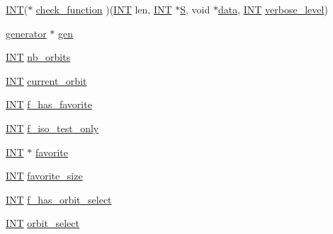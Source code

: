 \begin{DoxyCompactItemize}
\mbox{\hyperlink{galois_8h_a09fddde158a3a20bd2dcadb609de11dc}{I\+NT}}($\ast$ \mbox{\hyperlink{classchoose__points__or__lines_abc61ef917f72864b7f56ca351c84832d}{check\+\_\+function}} )(\mbox{\hyperlink{galois_8h_a09fddde158a3a20bd2dcadb609de11dc}{I\+NT}} len, \mbox{\hyperlink{galois_8h_a09fddde158a3a20bd2dcadb609de11dc}{I\+NT}} $\ast$\mbox{\hyperlink{simeon_8_c_adab47f8243f1b5a2c31df2535d6b37d0}{S}}, void $\ast$\mbox{\hyperlink{classchoose__points__or__lines_a8afcc173b9891ea488adc7a8708b5185}{data}}, \mbox{\hyperlink{galois_8h_a09fddde158a3a20bd2dcadb609de11dc}{I\+NT}} \mbox{\hyperlink{simeon_8_c_a818073fbcc2f439e7c56952f67386122}{verbose\+\_\+level}})
\item 
\mbox{\hyperlink{classgenerator}{generator}} $\ast$ \mbox{\hyperlink{classchoose__points__or__lines_a642aa5b197976155d67c5b34c56d2fd9}{gen}}
\item 
\mbox{\hyperlink{galois_8h_a09fddde158a3a20bd2dcadb609de11dc}{I\+NT}} \mbox{\hyperlink{classchoose__points__or__lines_a5fff403bc7d1f934a69b10e9a20f78e0}{nb\+\_\+orbits}}
\item 
\mbox{\hyperlink{galois_8h_a09fddde158a3a20bd2dcadb609de11dc}{I\+NT}} \mbox{\hyperlink{classchoose__points__or__lines_a5bd569fc8b518f5c245ac9a78c68ea8f}{current\+\_\+orbit}}
\item 
\mbox{\hyperlink{galois_8h_a09fddde158a3a20bd2dcadb609de11dc}{I\+NT}} \mbox{\hyperlink{classchoose__points__or__lines_a361a239d04d681471d63e47542d93c3c}{f\+\_\+has\+\_\+favorite}}
\item 
\mbox{\hyperlink{galois_8h_a09fddde158a3a20bd2dcadb609de11dc}{I\+NT}} \mbox{\hyperlink{classchoose__points__or__lines_a04099fd238ba58639fdeb279eba8012d}{f\+\_\+iso\+\_\+test\+\_\+only}}
\item 
\mbox{\hyperlink{galois_8h_a09fddde158a3a20bd2dcadb609de11dc}{I\+NT}} $\ast$ \mbox{\hyperlink{classchoose__points__or__lines_ab6477a0ea59aec445212acb7714922a6}{favorite}}
\item 
\mbox{\hyperlink{galois_8h_a09fddde158a3a20bd2dcadb609de11dc}{I\+NT}} \mbox{\hyperlink{classchoose__points__or__lines_afc84c5e3a79df8939316f156b23fa645}{favorite\+\_\+size}}
\item 
\mbox{\hyperlink{galois_8h_a09fddde158a3a20bd2dcadb609de11dc}{I\+NT}} \mbox{\hyperlink{classchoose__points__or__lines_aa6dcbf9bb6f63aeef5060c3d652e3f25}{f\+\_\+has\+\_\+orbit\+\_\+select}}
\item 
\mbox{\hyperlink{galois_8h_a09fddde158a3a20bd2dcadb609de11dc}{I\+NT}} \mbox{\hyperlink{classchoose__points__or__lines_ae67175fe883c021d498416113b920a28}{orbit\+\_\+select}}

\end{DoxyCompactItemize}
